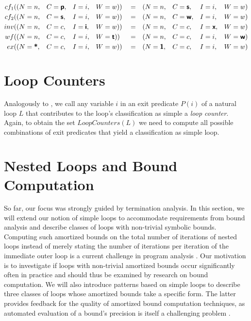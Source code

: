 \begin{align*}
    cf_1(&(N = n,&& C = \textsf{\bfseries p},&& I = i,&& W = w)) &&= &&(N = n,&& C = \textsf{\bfseries s},&& I = i,&& W = w) \\
    cf_2(&(N = n,&& C = \textsf{\bfseries s},&& I = i,&& W = w)) &&= &&(N = n,&& C = \textsf{\bfseries w},&& I = i,&& W = w) \\
    inv(&(N = n,&& C = c,&& I = \textsf{\bfseries i},&& W = w)) &&= &&(N = n,&& C = c,&& I = \textsf{\bfseries x},&& W = w) \\
    wf(&(N = n,&& C = c,&& I = i,&& W = \textsf{\bfseries t})) &&= &&(N = n,&& C = c,&& I = i,&& W = \textsf{\bfseries w}) \\
    ex(&(N = \textsf{\bfseries *},&& C = c,&& I = i,&& W = w)) &&= &&(N = \textsf{\bfseries 1},&& C = c,&& I = i,&& W = w) \\
\end{align*}


\section{Loop Counters}
\label{sec:counters}

Analogously to , we call any variable $i$ in an exit predicate $P(i)$ of a natural loop $L$ that contributes to the loop's classification as simple a \emph{loop counter}. Again, to obtain the set $LoopCounters(L)$ we need to compute all possible combinations of exit predicates that yield a classification as simple loop.

\section{Nested Loops and Bound Computation}

So far, our focus was strongly guided by termination analysis. In this section, we will extend our notion of simple loops to accommodate requirements from bound analysis and describe classes of loops with non-trivial symbolic bounds. Computing such amortized bounds on the total number of iterations of nested loops instead of merely stating the number of iterations per iteration of the immediate outer loop is a current challenge in program analysis \cite{DBLP:conf/pldi/GulwaniZ10}. Our motivation is to investigate if loops with non-trivial amortized bounds occur significantly often in practice and should thus be examined by research on bound computation. We will also introduce patterns based on simple loops to describe three classes of loops whose amortized bounds take a specific form. The latter provides feedback for the quality of amortized bound computation techniques, as automated evaluation of a bound's precision is itself a challenging problem \cite{DBLP:conf/pldi/GulwaniZ10}.

